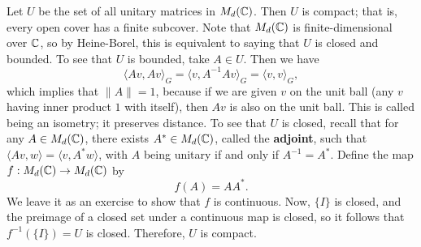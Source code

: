 Let $U$ be the set of all unitary matrices in $M_d(\mathbb{C})$. Then $U$ is compact;
that is, every open cover has a finite subcover. Note that $M_d(\mathbb{C})$ is 
finite-dimensional over $\mathbb{C}$, so by Heine-Borel, this is equivalent to 
saying that $U$ is closed and bounded. To see that $U$ is bounded, take 
$A \in U$. Then we have 
\[ \langle Av, Av \rangle_G = \langle v, A^{-1}Av \rangle_G = \langle v, v 
\rangle_G, \] 
which implies that $\|A\| = 1$, because if we are given $v$ on the unit ball
(any $v$ having inner product $1$ with itself), then $Av$ is also on the unit 
ball. This is called being an isometry; it preserves distance. To 
see that $U$ is closed, recall that for any $A \in M_d(\mathbb{C})$, there exists 
$A^* \in M_d(\mathbb{C})$, called the \textbf{adjoint}, such that $\langle Av, w 
\rangle = \langle v, A^*w \rangle$, with $A$ being unitary if and only if 
$A^{-1} = A^*$. Define the map $f : M_d(\mathbb{C}) \to M_d(\mathbb{C})$ by 
\[ f(A) = AA^*. \] 
We leave it as an exercise to show that $f$ is continuous. Now, $\{I\}$ 
is closed, and the preimage of a closed set under a continuous map is 
closed, so it follows that $f^{-1}(\{I\}) = U$ is closed. Therefore, 
$U$ is compact. 
